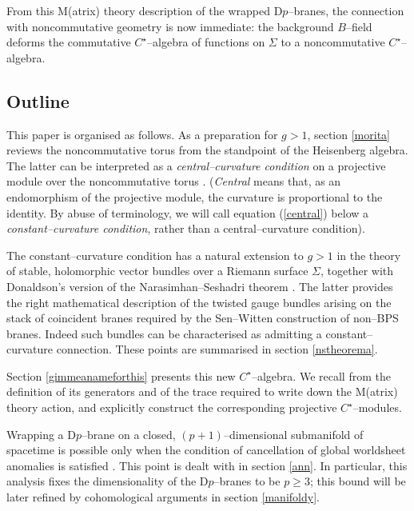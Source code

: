 \documentclass[a4paper,a4paper]{article}
\begin{document}
{}From this M(atrix) theory description of the wrapped D$p$--branes,  
the connection with noncommutative geometry \cite{NCG} is now immediate:
the background $B$--field deforms the commutative $C^{\star}$--algebra of 
functions on $\Sigma$ to a noncommutative $C^{\star}$--algebra.
  
\subsection{Outline}\label{outline}  

This paper is organised as follows.  As a preparation for $g>1$,
section \ref{morita} reviews the noncommutative torus from the 
standpoint of the Heisenberg algebra. The latter can be interpreted 
as a {\it central--curvature condition} on a projective module over 
the noncommutative torus \cite{SCHWARZ, KONECHNYSCHWARZ}.
({\it Central} means that, as an endomorphism of the projective module, 
the curvature is proportional to the identity. By abuse of terminology, 
we will call equation (\ref{central}) below a {\it constant--curvature condition}, 
rather than a central--curvature condition).

The constant--curvature condition has a natural extension to $g>1$ 
in the theory of stable, holomorphic vector bundles over a Riemann surface 
$\Sigma$, together with Donaldson's version \cite{DONALDSON} 
of the Narasimhan--Seshadri theorem \cite{NASE}. 
The latter provides the right mathematical description of the twisted 
gauge bundles arising on the stack of coincident branes required by the 
Sen--Witten construction of non--BPS branes. Indeed such bundles 
can be characterised as admitting a constant--curvature connection.  
These points are summarised in section \ref{nstheorema}.  

Section \ref{gimmeanameforthis} presents this new $C^{\star}$--algebra. 
We recall from \cite{PROCEEDINGS} the definition of its generators and 
of the trace required to write down the M(atrix) theory action, 
and explicitly construct the corresponding projective $C^{\star}$--modules.  

Wrapping a D$p$--brane on a closed, $(p+1)$--dimensional submanifold of spacetime 
is possible only when the condition of cancellation of global worldsheet anomalies 
is satisfied \cite{WITTENDK, BARYONS, FREEDWITTEN, KAPUSTIN}. This point is dealt 
with in section \ref{ann}. In particular, this analysis fixes the  
dimensionality of the D$p$--branes to be $p\geq 3$; this bound will be 
later refined by cohomological arguments in section \ref{manifoldy}.
\end{document}
